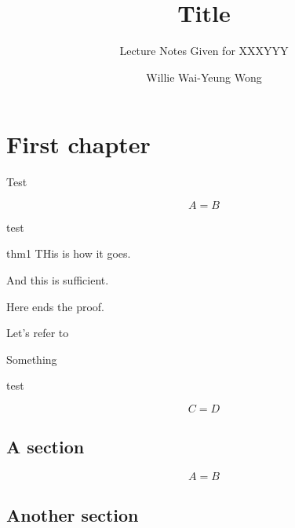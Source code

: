 \documentclass[noocg]{wwwnotes2}
\title{Title}
\subtitle{Lecture Notes Given for XXXYYY}
\author{Willie Wai-Yeung Wong}
\begin{document}
\maketitle

\tableofcontents

\chapter{First chapter}

\lipsum[1-2]

Test 

\begin{equation}
	A = B
\end{equation}

\begin{thm}\label{thm1}
	\lipsum[27]

	test
\end{thm}

\lipsum[1-3]

\begin{pfof}{thm1}
THis is how it goes.
\begin{paras}[Step 1]\label{parastep}
	\lipsum[9-10]

	And this is sufficient.
\end{paras}
Here ends the proof.
\end{pfof}

Let's refer to 

\begin{paras}
	\lipsum[2-3]

	Something
\end{paras}

\begin{rmk}
	\lipsum[27]

	test
\end{rmk}

\begin{equation}
	C = D
\end{equation}

\section{A section}
\lipsum[2]

\begin{equation}
	A = B
\end{equation}

\lipsum[3-8]



\section{Another section}
\end{document}

